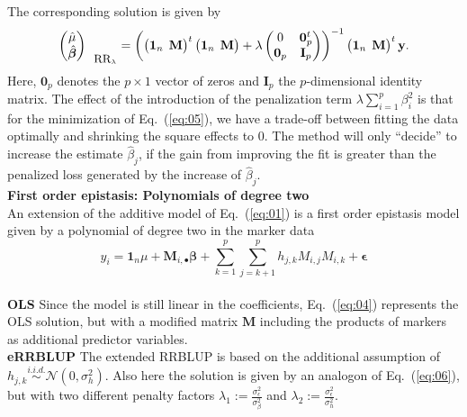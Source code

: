 \documentclass{bmcart}
\newcommand{\M}{\mathbf{M}}
\newcommand{\0}{\mathbf{0}}
\begin{document}
The corresponding solution is given by 
\begin{equation}
	\begin{pmatrix}
		\hat{\mu} \\
		\hat{\bm{\beta}}
	\end{pmatrix}_{\mbox{\small RR}_\lambda} =
	\left( 
	\begin{pmatrix}
		\mathbf{1}_n & \hspace{-0.2cm}\M
	\end{pmatrix}^{t}
	\begin{pmatrix}
		\mathbf{1}_n & \hspace{-0.2cm} \M
	\end{pmatrix} + \lambda \begin{pmatrix}
		0 & \mathbf{0 }_p^t \\
		\mathbf{0 }_p & \mathbf{I}_p
	\end{pmatrix} 
	\right)^{-1} 
	\begin{pmatrix}
		\mathbf{1}_n & \hspace{-0.2cm} \M
	\end{pmatrix}^{t}
	\mathbf{y}. \label{eq:06}
\end{equation}
Here, $\mathbf{0 }_p$ denotes the $p \times 1$ vector of zeros and $\mathbf{I}_p$ the $p$-dimensional identity matrix. 
The effect of the introduction of the penalization term $\lambda \sum\limits_{i=1}^p {\beta}_i^2$ is that for the minimization of Eq.~(\ref{eq:05}), we have a trade-off between fitting the data optimally and shrinking the square effects to $0$. The method will only ``decide'' to increase the estimate $\hat{\beta}_j$, if the gain from improving the fit is greater than the penalized loss generated by the increase of $\hat{\beta}_j$.  \vspace{0.4cm} \\

{\bf First order epistasis: Polynomials of degree two}\vspace{0.2cm}\\ 
An extension of the additive model of Eq.~(\ref{eq:01}) is a first order epistasis model given by a polynomial of degree two in the marker data \cite{ober15,jiang15,Martini16}
\begin{equation} \label{eq:07}
	y_i =\mathbf{1}_n \mu + \M_{i,\bullet}\bm{\beta} + \sum\limits_{k=1}^p\sum\limits_{j=k+1}^p h_{j,k}M_{i,j}M_{i,k} + \bm{\epsilon}
\end{equation}\vspace{0.1cm}\\
{\bf OLS} Since the model is still linear in the coefficients, Eq.~(\ref{eq:04}) represents the OLS solution, but with a modified matrix $\M$ including the products of markers as additional predictor variables. \vspace{0.4cm}\\
{\bf eRRBLUP}
The extended RRBLUP is based on the additional assumption of $h_{j,k }\stackrel{i.i.d.}{\sim} \mathcal{N}(0,\sigma_h^2 )$. Also here the solution is given by an analogon of Eq.~(\ref{eq:06}), but with two different penalty factors $\lambda_1:=\frac{\sigma_\epsilon^2}{\sigma_\beta^2}$ and $\lambda_2:=\frac{\sigma_\epsilon^2}{\sigma_h^2}$.
\vspace{0.4cm}\\
\end{document}

